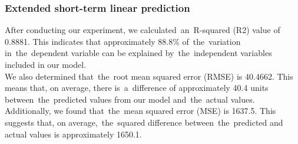    \subsubsection{Extended short-term linear prediction} \label{subsec:res_estlp}
    After conducting our experiment, we calculated~an~R-squared (R2) value of 0.8881.
    This indicates that approximately 88.8\% of~the~variation in~the~dependent
    variable can be explained by~the~independent variables included in our model.\\ 
    We also determined that~the~root mean squared error (RMSE) is 40.4662.
    This means that, on average, there is~a~difference of approximately 40.4
    units between~the~predicted values from our model and~the~actual values.\\
    Additionally, we found that~the~mean squared error (MSE) is 1637.5.
    This suggests that, on average,~the~squared difference between~the~predicted
    and actual values is approximately 1650.1.
